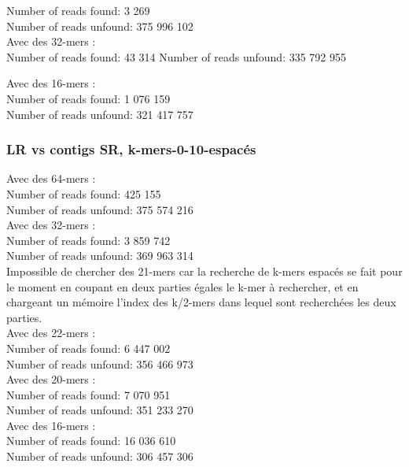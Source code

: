 \documentclass[12pt]{article}
\begin{document}
Number of reads found: 3 269 \\
Number of reads unfound: 375 996 102 \\

Avec des 32-mers : \\

Number of reads found: 43 314
Number of reads unfound: 335 792 955

Avec des 16-mers : \\

Number of reads found: 1 076 159 \\
Number of reads unfound: 321 417 757 \\

\subsubsection{LR vs contigs SR, k-mers-0-10-espacés}

Avec des 64-mers : \\

Number of reads found: 425 155 \\
Number of reads unfound: 375 574 216 \\

Avec des 32-mers : \\

Number of reads found: 3 859 742 \\
Number of reads unfound: 369 963 314 \\

Impossible de chercher des 21-mers car la recherche de k-mers espacés se fait pour le moment en coupant en deux parties égales le k-mer 
à rechercher, et en chargeant un mémoire l'index des k/2-mers dans lequel sont recherchées les deux parties. \\

Avec des 22-mers : \\

Number of reads found: 6 447 002 \\
Number of reads unfound: 356 466 973 \\ 

Avec des 20-mers : \\

Number of reads found: 7 070 951 \\
Number of reads unfound: 351 233 270 \\

Avec des 16-mers : \\

Number of reads found: 16 036 610 \\
Number of reads unfound: 306 457 306 \\
\end{document}
